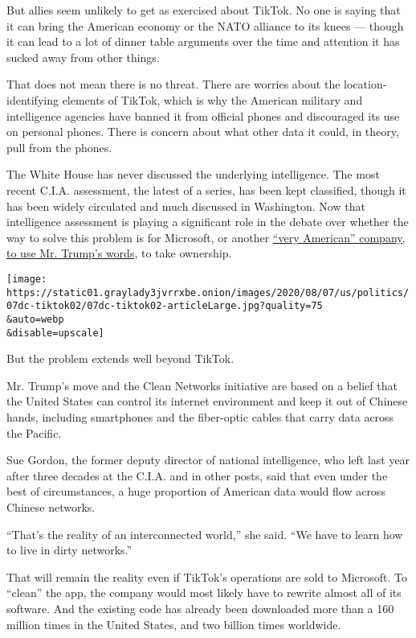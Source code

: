 But allies seem unlikely to get as exercised about TikTok. No one is
saying that it can bring the American economy or the NATO alliance to
its knees --- though it can lead to a lot of dinner table arguments over
the time and attention it has sucked away from other things.

That does not mean there is no threat. There are worries about the
location-identifying elements of TikTok, which is why the American
military and intelligence agencies have banned it from official phones
and discouraged its use on personal phones. There is concern about what
other data it could, in theory, pull from the phones.

The White House has never discussed the underlying intelligence. The
most recent C.I.A. assessment, the latest of a series, has been kept
classified, though it has been widely circulated and much discussed in
Washington. Now that intelligence assessment is playing a significant
role in the debate over whether the way to solve this problem is for
Microsoft, or another
\href{https://www.nytimes3xbfgragh.onion/2020/08/03/business/economy/trump-tiktok-china-business.html}{``very
American'' company, to use Mr. Trump's words}, to take ownership.

\texttt{[image: https://static01.graylady3jvrrxbe.onion/images/2020/08/07/us/politics/07dc-tiktok02/07dc-tiktok02-articleLarge.jpg?quality=75\\\&auto=webp\\\&disable=upscale]}

But the problem extends well beyond TikTok.

Mr. Trump's move and the Clean Networks initiative are based on a belief
that the United States can control its internet environment and keep it
out of Chinese hands, including smartphones and the fiber-optic cables
that carry data across the Pacific.

Sue Gordon, the former deputy director of national intelligence, who
left last year after three decades at the C.I.A. and in other posts,
said that even under the best of circumstances, a huge proportion of
American data would flow across Chinese networks.

``That's the reality of an interconnected world,'' she said. ``We have
to learn how to live in dirty networks.''

That will remain the reality even if TikTok's operations are sold to
Microsoft. To ``clean'' the app, the company would most likely have to
rewrite almost all of its software. And the existing code has already
been downloaded more than a 160 million times in the United States, and
two billion times worldwide.


